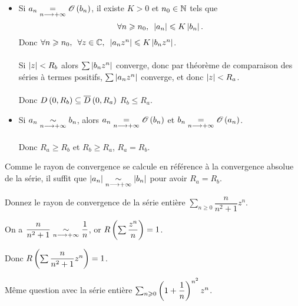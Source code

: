 \begin{dem}
\begin{itemize}
    \item Si \(a_n\underset{n\longrightarrow+\infty}{=}\mathscr{O}\left(b_n\right)\), il existe \(K>0\) et \(n_0\in\mathbb{N}\) tels que \[\quantifs{\forall n\geq n_0}\abs{a_n}\leq K\abs{b_n}.\] Donc \(\quantifs{\forall n\geq n_0;\forall z\in\C}\abs{a_nz^n}\leq K\abs{b_nz^n}\). \\\\ Si \(\left\lvert z\right\rvert<R_b\) alors \(\sum\left\lvert b_nz^n\right\rvert\) converge, donc par théorème de comparaison des séries à termes positifs, \(\sum\left\lvert a_nz^n\right\rvert\) converge, et donc \(\left\lvert z\right\rvert<R_a\). \\\\ Donc \(\disqueo{0}{R_b}\subset\disquef{0}{R_a}\) \ie \(R_b\leq R_a\). \\
    \item Si \(a_n\underset{n\longrightarrow+\infty}{\sim}b_n\), alors \(a_n\underset{n\longrightarrow+\infty}{=}\mathscr{O}\left(b_n\right)\) et \(b_n\underset{n\longrightarrow+\infty}{=}\mathscr{O}\left(a_n\right)\). \\\\ Donc \(R_a\geq R_b\) et \(R_b\geq R_a\), \ie \(R_a=R_b\).
\end{itemize}
\end{dem}

\begin{rem}
Comme le rayon de convergence se calcule en référence à la convergence absolue de la série, il suffit que \(\left\lvert a_n\right\rvert\underset{n\longrightarrow+\infty}{\sim}\left\lvert b_n\right\rvert\) pour avoir \(R_a=R_b\).
\end{rem}

\begin{exo}
Donnez le rayon de convergence de la série entière \(\sum_{n\geq0}\dfrac{n}{n^2+1}z^n\).
\end{exo}

\begin{corr}
On a \(\dfrac{n}{n^2+1}\underset{n\longrightarrow+\infty}{\sim}\dfrac{1}{n}\), or \(R\left(\sum\dfrac{z^n}{n}\right)=1\).

Donc \(R\left(\sum\dfrac{n}{n^2+1}z^n\right)=1\).
\end{corr}

\begin{exo}
Même question avec la série entière \(\sum_{n\geqslant0}\left(1+\dfrac{1}{n}\right)^{n^2}z^n\).
\end{exo}

